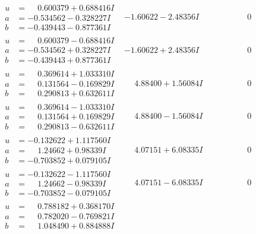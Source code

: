 \documentclass[1p]{elsarticle_modified}
\theoremstyle{definition}
\begin{document}
$$\begin{array}{c|c|c}
\begin{aligned}
u &= \phantom{-}0.600379 + 0.688416 I \\
a &= -0.534562 - 0.328227 I \\
b &= -0.439443 - 0.877361 I\end{aligned}
 & -1.60622 - 2.48356 I & \phantom{-0.000000 } 0 \\ \hline\begin{aligned}
u &= \phantom{-}0.600379 - 0.688416 I \\
a &= -0.534562 + 0.328227 I \\
b &= -0.439443 + 0.877361 I\end{aligned}
 & -1.60622 + 2.48356 I & \phantom{-0.000000 } 0 \\ \hline\begin{aligned}
u &= \phantom{-}0.369614 + 1.033310 I \\
a &= \phantom{-}0.131564 - 0.169829 I \\
b &= \phantom{-}0.290813 + 0.632611 I\end{aligned}
 & \phantom{-}4.88400 + 1.56084 I & \phantom{-0.000000 } 0 \\ \hline\begin{aligned}
u &= \phantom{-}0.369614 - 1.033310 I \\
a &= \phantom{-}0.131564 + 0.169829 I \\
b &= \phantom{-}0.290813 - 0.632611 I\end{aligned}
 & \phantom{-}4.88400 - 1.56084 I & \phantom{-0.000000 } 0 \\ \hline\begin{aligned}
u &= -0.132622 + 1.117560 I \\
a &= \phantom{-}1.24662 + 0.98339 I \\
b &= -0.703852 + 0.079105 I\end{aligned}
 & \phantom{-}4.07151 + 6.08335 I & \phantom{-0.000000 } 0 \\ \hline\begin{aligned}
u &= -0.132622 - 1.117560 I \\
a &= \phantom{-}1.24662 - 0.98339 I \\
b &= -0.703852 - 0.079105 I\end{aligned}
 & \phantom{-}4.07151 - 6.08335 I & \phantom{-0.000000 } 0 \\ \hline\begin{aligned}
u &= \phantom{-}0.788182 + 0.368170 I \\
a &= \phantom{-}0.782020 - 0.769821 I \\
b &= \phantom{-}1.048490 + 0.884888 I\end{aligned}

\end{array}$$
\end{document}
